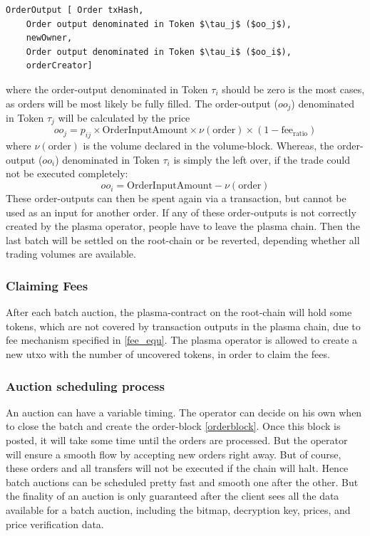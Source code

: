 \documentclass[11pt,parskip=full]{scrartcl}%
\begin{document}
\begin{lstlisting}
OrderOutput [ Order txHash,
    Order output denominated in Token $\tau_j$ ($oo_j$), 
    newOwner,
    Order output denominated in Token $\tau_i$ ($oo_i$),
    orderCreator]

\end{lstlisting}
where the order-output denominated in Token $\tau_i$ should be zero is the most cases, as orders will be most likely be fully filled. 
The order-output ($oo_j$) denominated in Token $\tau_j$ will be calculated by the price 
\begin{equation}
  oo_j = p_{ij} \times \text{OrderInputAmount} \times \nu(\text{order}) \times (1-\text{fee}_{\text{ratio}})
    \label{fee_equ}
\end{equation}
where $\nu(\text{order})$ is the volume declared in the volume-block.  
Whereas, the order-output ($oo_i$) denominated in Token $\tau_i$ is simply the left over, if the trade could not be executed completely: 
\begin{equation}
  oo_i =  \text{OrderInputAmount} - \nu(\text{order})
\end{equation}
These order-outputs can then be spent again via a transaction, but cannot be used as an input for another order. 
If any of these order-outputs is not correctly created by the plasma operator, people have to leave the plasma chain. 
Then the last batch will be settled on the root-chain or be reverted, depending whether all trading volumes are available. 

\subsubsection{Claiming Fees}
After each batch auction, the plasma-contract on the root-chain will hold some tokens, which are not covered by transaction outputs in the plasma chain, due to fee mechanism specified in \ref{fee_equ}. 
The plasma operator is allowed to create a new utxo with the number of uncovered tokens, in order to claim the fees. 

\subsubsection{Auction scheduling process}

An auction can have a variable timing. 
The operator can decide on his own when to close the batch and create the order-block \ref{orderblock}. 
Once this block is posted, it will take some time until the orders are processed. 
But the operator will ensure a smooth flow by accepting new orders right away. 
But of course, these orders and all transfers will not be executed if the chain will halt. 
Hence batch auctions can be scheduled pretty fast and smooth one after the other. 
But the finality of an auction is only guaranteed after the client sees all the data available for a batch auction, including the bitmap, decryption key, prices, and price verification data. 
\end{document}
